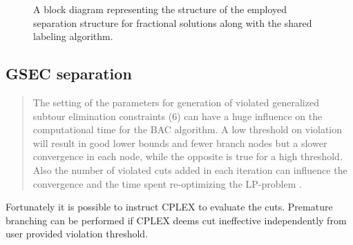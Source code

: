 \begin{figure}[ht]
	\centering
	\caption{A block diagram representing the structure
		of the employed separation structure for fractional solutions
		along with the shared labeling algorithm.
	}
	\label{fig:fractional-separation-block-diagram}
\end{figure}

\subsection{GSEC separation}
\label{sec:impl-gsec-separation}

\begin{quote}
	The setting of the parameters for generation of violated generalized subtour elimination constraints
	(6) can have a huge influence on the computational time for the BAC algorithm. A low threshold on
	violation will result in good lower bounds and fewer branch nodes but a slower convergence in each
	node, while the opposite is true for a high threshold. Also the number of violated cuts added in each
	iteration can influence the convergence and the time spent re-optimizing the LP-problem \cite{jepsen2008branchandcut}.
\end{quote}


Fortunately it is possible to instruct CPLEX to evaluate the cuts.
Premature branching can be performed if CPLEX deems cut ineffective independently
from user provided violation threshold.



